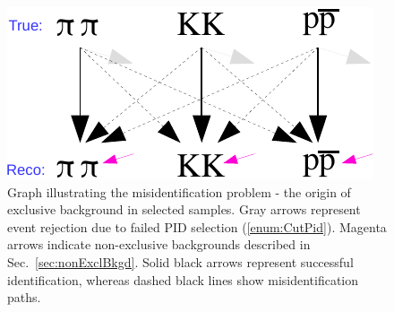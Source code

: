 \begin{figure}[h!]\vspace{5pt}
\centering%
\parbox{0.4725\textwidth}{%
  \centering%
  \includegraphics[width=\linewidth]{graphics/backgrounds/pid-crop2.pdf}
}%
\quad%
\parbox{0.4725\textwidth}{%
    \caption[Graph illustrating the misidentification problem.]{Graph illustrating the misidentification problem - the origin of exclusive background in selected samples. Gray arrows represent event rejection due to failed PID selection (\ref{enum:CutPid}). Magenta arrows indicate non-exclusive backgrounds described in Sec.~\ref{sec:nonExclBkgd}. Solid black arrows represent successful identification, whereas dashed black lines show misidentification paths.}\label{fig:misidentificationGraph}
}%
\vspace{5pt}
\end{figure}

